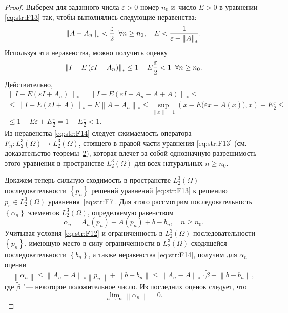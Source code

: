 \begin{proof}
Выберем для заданного числа $\varepsilon >0$  номер $n_{0} $ и~число $E>0$ в уравнении \eqref{eq:str:F13} так, чтобы выполнялись следующие неравенства:
\begin{gather}
\left\| A-A_{n} \right\|_{*} <\frac{\varepsilon }{2} {\rm \; \; } \forall n\ge n_{0} , \quad 
E<\frac{1}{\varepsilon +\left\| A\right\| _{*} }.
\end{gather}
Используя эти неравенства, можно получить оценку
\begin{equation}\left\| I-E  \left(\varepsilon  I+A_{n} \right)\right\| _{*} \le 1-E  \frac{\varepsilon }{2} <1{\rm \; \; }\forall n\ge n_{0} .
\label{eq:str:F14}
\end{equation}                    
Действительно,
\begin{multline*}
\left\| I-E  \left(\varepsilon   I+A_{n} \right)\right\| _{*} =\left\| I-E  \left(\varepsilon   I+A_{n} -A+A\right)\right\| _{*} \le \\ 
\le \left\| I-E  \left(\varepsilon   I+A\right)\right\| _{*} +E\left\| A-A_{n} \right\| _{*} %
\le \mathop{\sup }\limits_{\left\| x\right\| =1} \left(x-E\bigl(\varepsilon   x+A(x)\bigr),x\right)+E  \frac{\varepsilon }{2} \le 
\\ \le 1-E  \varepsilon +E  \frac{\varepsilon }{2} =1-E  \frac{\varepsilon }{2} <1.
\end{multline*}
Из неравенства \eqref{eq:str:F14} следует сжимаемость оператора $F_{n} \colon L_{2}^{3} (\Omega)\to L_{2}^{3} (\Omega)$, стоящего в правой части уравнения \eqref{eq:str:F13} (см.
доказательство теоремы~\hyperlink{str:th2}{2}), которая влечет за собой однозначную разрешимость этого уравнения в пространстве $L_{2}^{3} (\Omega)$ для всех натуральных $n\ge n_{0} $.

Докажем теперь сильную сходимость в пространстве $L_{2}^{3} (\Omega)$ последовательности $\left\{p_{n} \right\}$ решений уравнений \eqref{eq:str:F13} к решению $p_{\varepsilon } \in L_{2}^{3} (\Omega)$ уравнения~\eqref{eq:str:F7}.
Для этого рассмотрим последовательность $\left\{\alpha _{n} \right\}$ элементов  $L_{2}^{3} (\Omega)$, определяемую равенством
$$\alpha _{n} =A_{n} \left(p_{n} \right)-A\left(p_{n} \right)+b-b_{n}, \quad n\ge n_{0} .$$ 
Учитывая условия \eqref{eq:str:F12} и ограниченность в $L_{2}^{3} (\Omega)$ последовательности $\left\{p_{n} \right\}$, имеющую место в силу ограниченности в $L_{2}^{3} (\Omega)$ сходящейся последовательности $\left\{b_{n} \right\}$, а также неравенства \eqref{eq:str:F14}, получим для $\alpha _{n} $ оценки
$$\left\| \alpha _{n} \right\| \le \left\| A_{n} -A\right\| _{*} \left\| p_{n} \right\| +\left\| b-b_{n} \right\| \le \left\| A_{n} -A\right\| _{*}\cdot \tilde{\beta} +\left\| b-b_{n} \right\|,$$ 
где $\tilde{\beta}$ "--- некоторое положительное число.
Из последних оценок следует, что 
\begin{equation}
\lim \limits_{n\to \infty } \left\| \alpha _{n} \right\| =0.
\label{last-proof}
\end{equation}


\end{proof}
